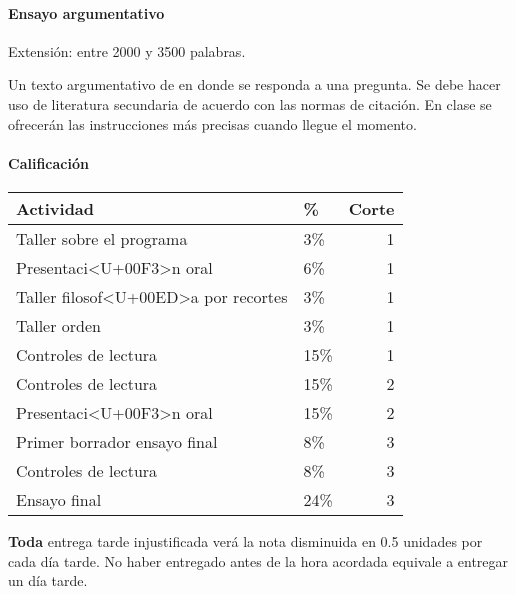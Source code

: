 \documentclass[spanish,]{article}
\let\oldparagraph\paragraph
\renewcommand{\paragraph}[1]{\oldparagraph{#1}\mbox{}}
\begin{document}
\paragraph{\texorpdfstring{\textbf{Ensayo
argumentativo}}{Ensayo argumentativo}}\label{ensayo-argumentativo}

Extensión: entre 2000 y 3500 palabras.

Un texto argumentativo de en donde se responda a una pregunta. Se debe
hacer uso de literatura secundaria de acuerdo con las normas de
citación. En clase se ofrecerán las instrucciones más precisas cuando
llegue el momento.

\paragraph{\texorpdfstring{\textbf{Calificación}}{Calificación}}\label{calificacion}

\begin{tabular}{l|l|r}
\hline
Actividad & \% & Corte\\
\hline
Taller sobre el programa & 3\% & 1\\
\hline
Presentaci<U+00F3>n oral & 6\% & 1\\
\hline
Taller filosof<U+00ED>a por recortes & 3\% & 1\\
\hline
Taller orden & 3\% & 1\\
\hline
Controles de lectura & 15\% & 1\\
\hline
Controles de lectura & 15\% & 2\\
\hline
Presentaci<U+00F3>n oral & 15\% & 2\\
\hline
Primer borrador ensayo final & 8\% & 3\\
\hline
Controles de lectura & 8\% & 3\\
\hline
Ensayo final & 24\% & 3\\
\hline
\end{tabular}

\textbf{Toda} entrega tarde injustificada verá la nota disminuida en 0.5
unidades por cada día tarde. No haber entregado antes de la hora
acordada equivale a entregar un día tarde.
\end{document}
